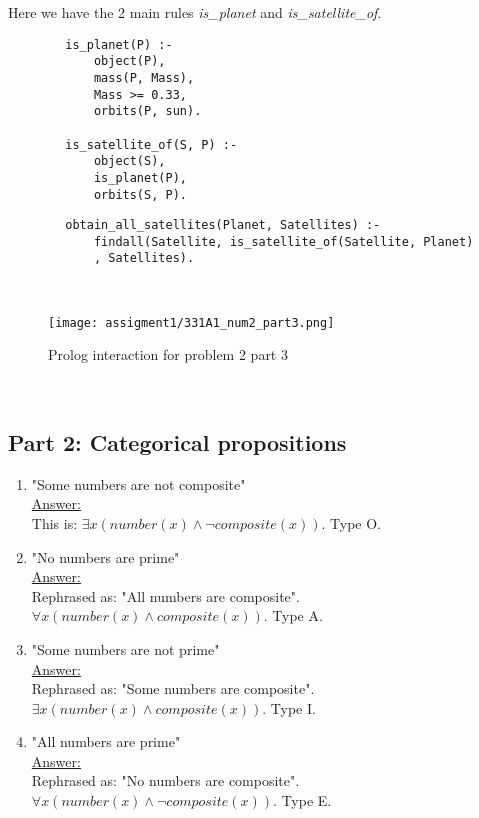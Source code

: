 \begin{enumerate}
Here we have the 2 main rules \textit{is\_planet} and \textit{is\_satellite\_of}.    
    \begin{lstlisting}
        is_planet(P) :-
            object(P),
            mass(P, Mass),
            Mass >= 0.33,
            orbits(P, sun).

        is_satellite_of(S, P) :-
            object(S),
            is_planet(P),
            orbits(S, P).
    \end{lstlisting}

    \begin{lstlisting}
        obtain_all_satellites(Planet, Satellites) :-
            findall(Satellite, is_satellite_of(Satellite, Planet)
            , Satellites).
    \end{lstlisting} \\
    \begin{figure}[hbt!]
        \centering
        \texttt{[image: assigment1/331A1\_num2\_part3.png]}
        \caption{Prolog interaction for problem 2 part 3}
    \end{figure}\\

\end{enumerate}


\newpage

\subsection{Part 2: Categorical propositions}
\begin{enumerate}
    \item "Some numbers are not composite"\\
    \underline{Answer:}\\
    This is: $\exists x(number(x) \wedge \neg composite(x))$. Type  O.
    \\
    \item "No numbers are prime"\\
    \underline{Answer:}\\
    Rephrased as: "All numbers are composite". $\forall x(number(x) \wedge composite(x))$. Type A.
    \\
    \item "Some numbers are not prime"\\
    \underline{Answer:}\\
    Rephrased as: "Some numbers are composite". $\exists x(number(x) \wedge composite(x))$. Type I.
    \\
    \item "All numbers are prime"\\
    \underline{Answer:}\\
    Rephrased as: "No numbers are composite". $\forall x(number(x) \wedge \neg composite(x))$. Type E.
    \\
\end{enumerate}
\newpage
